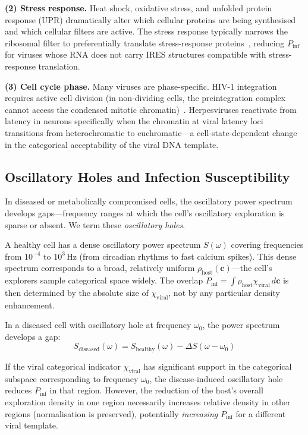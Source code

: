 \documentclass[12pt,a4paper]{article}
\theoremstyle{definition}
\theoremstyle{remark}
\newcommand{\Phost}{\rho_{\mathrm{host}}}
\newcommand{\chiviral}{\chi_{\mathrm{viral}}}
\newcommand{\vv}[1]{\boldsymbol{#1}}
\begin{document}
\textbf{(2) Stress response.} Heat shock, oxidative stress, and unfolded protein response (UPR) dramatically alter which cellular proteins are being synthesised and which cellular filters are active. The stress response typically narrows the ribosomal filter to preferentially translate stress-response proteins~\cite{Holcik2005}, reducing $P_{\mathrm{inf}}$ for viruses whose RNA does not carry IRES structures compatible with stress-response translation.

\textbf{(3) Cell cycle phase.} Many viruses are phase-specific. HIV-1 integration requires active cell division (in non-dividing cells, the preintegration complex cannot access the condensed mitotic chromatin)~\cite{Weinberg1991}. Herpesviruses reactivate from latency in neurons specifically when the chromatin at viral latency loci transitions from heterochromatic to euchromatic---a cell-state-dependent change in the categorical acceptability of the viral DNA template.

\subsection{Oscillatory Holes and Infection Susceptibility}

In diseased or metabolically compromised cells, the oscillatory power spectrum develops gaps---frequency ranges at which the cell's oscillatory exploration is sparse or absent. We term these \emph{oscillatory holes}.

A healthy cell has a dense oscillatory power spectrum $S(\omega)$ covering frequencies from $10^{-4}$ to $10^3$\,Hz (from circadian rhythms to fast calcium spikes). This dense spectrum corresponds to a broad, relatively uniform $\Phost(\vv{c})$---the cell's explorers sample categorical space widely. The overlap $P_{\mathrm{inf}} = \int \Phost \chiviral\,d\vv{c}$ is then determined by the absolute size of $\chiviral$, not by any particular density enhancement.

In a diseased cell with oscillatory hole at frequency $\omega_0$, the power spectrum develops a gap:
\begin{equation}
  S_{\mathrm{diseased}}(\omega) = S_{\mathrm{healthy}}(\omega) - \Delta S(\omega - \omega_0)
\end{equation}

If the viral categorical indicator $\chiviral$ has significant support in the categorical subspace corresponding to frequency $\omega_0$, the disease-induced oscillatory hole reduces $P_{\mathrm{inf}}$ in that region. However, the reduction of the host's overall exploration density in one region necessarily increases relative density in other regions (normalisation is preserved), potentially \emph{increasing} $P_{\mathrm{inf}}$ for a different viral template.
\end{document}
